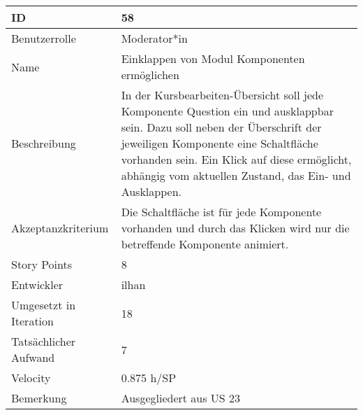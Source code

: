 \begin{tabularx}{\textwidth}{|p{}|X|}
	\hline
	ID & 58\\
	\hline
	Benutzerrolle & Moderator*in\\
	\hline
	Name & Einklappen von Modul Komponenten ermöglichen\\
	\hline
	Beschreibung & In der Kursbearbeiten-Übersicht soll jede Komponente Question ein und ausklappbar sein.
		Dazu soll neben der Überschrift der jeweiligen Komponente eine Schaltfläche vorhanden sein.
		Ein Klick auf diese ermöglicht, abhängig vom aktuellen Zustand, das Ein- und Ausklappen.\\
	\hline
	Akzeptanzkriterium & Die Schaltfläche ist für jede Komponente vorhanden und durch das Klicken wird nur die betreffende Komponente animiert.\\
	\hline
	Story Points & 8\\
	\hline
	Entwickler & ilhan\\
	\hline
	Umgesetzt in Iteration & 18\\
	\hline
	Tatsächlicher Aufwand & 7\\
	\hline
	Velocity & 0.875 h/SP\\
	\hline
	Bemerkung & Ausgegliedert aus US 23\\
	\hline
\end{tabularx}
\vspace{20pt}
